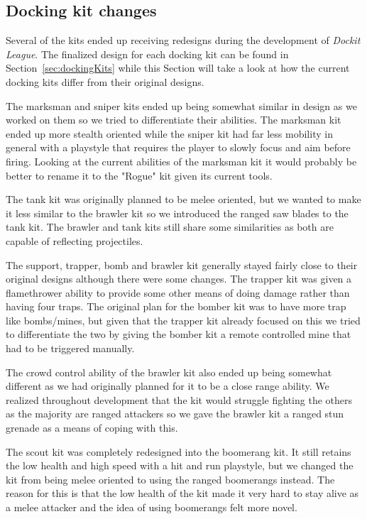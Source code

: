 \subsection{Docking kit changes}
Several of the kits ended up receiving redesigns during the development of \emph{Dockit League}. The finalized design for each docking kit can be found in Section~\ref{sec:dockingKits} while this Section will take a look at how the current docking kits differ from their original designs. 

The marksman and sniper kits ended up being somewhat similar in design as we worked on them so we tried to differentiate their abilities. The marksman kit ended up more stealth oriented while the sniper kit had far less mobility in general with a playstyle that requires the player to slowly focus and aim before firing. Looking at the current abilities of the marksman kit it would probably be better to rename it to the "Rogue" kit given its current tools. 

The tank kit was originally planned to be melee oriented, but we wanted to make it less similar to the brawler kit so we introduced the ranged saw blades to the tank kit. The brawler and tank kits still share some similarities as both are capable of reflecting projectiles. 

The support, trapper, bomb and brawler kit generally stayed fairly close to their original designs although there were some changes. The trapper kit was given a flamethrower ability to provide some other means of doing damage rather than having four traps. The original plan for the bomber kit was to have more trap like bombs/mines, but given that the trapper kit already focused on this we tried to differentiate the two by giving the bomber kit a remote controlled mine that had to be triggered manually.

The crowd control ability of the brawler kit also ended up being somewhat different as we had originally planned for it to be a close range ability. We realized throughout development that the kit would struggle fighting the others as the majority are ranged attackers so we gave the brawler kit a ranged stun grenade as a means of coping with this. 
    
The scout kit was completely redesigned into the boomerang kit. It still retains the low health and high speed with a hit and run playstyle, but we changed the kit from being melee oriented to using the ranged boomerangs instead. The reason for this is that the low health of the kit made it very hard to stay alive as a melee attacker and the idea of using boomerangs felt more novel. 